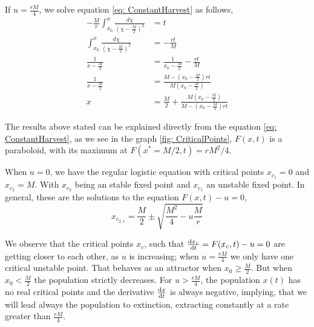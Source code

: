 If $u=\frac{rM}{4}$, we solve equation \ref{eq: ConstantHarvest} as follows,
\begin{align}
-\frac{M}{r}\int_{x_0}^{x}\frac{d\chi}{\left(\chi-\frac{M}{2}\right)^2}&=t\\
\int_{x_0}^{x}\frac{d\chi}{\left(\chi-\frac{M}{2}\right)^2}&=-\frac{rt}{M}\\
\frac{1}{x-\frac{M}{2}}&=\frac{1}{x_0-\frac{M}{2}}-\frac{rt}{M}\\
\frac{1}{x-\frac{M}{2}}&=\frac{M-\left(x_0-\frac{M}{2}\right)rt}{M\left(x_0-\frac{M}{2}\right)} \\
x&=\frac{M}{2}+\frac{M\left(x_0-\frac{M}{2}\right)}{M-\left(x_0-\frac{M}{2}\right)rt} 
\end{align}

The results above stated can be explained directly from the equation \ref{eq: ConstantHarvest}, as we see in the graph \ref{fig: CriticalPoints},  $F(x,t)$ is a paraboloid, with its maximum at $F(x^*=M/2,t)=rM^2/4$.

When $u=0$, we have the regular logistic equation with critical points $x_{c_1}=0$ and $x_{c_2}=M$. With $x_{c_2}$ being an stable fixed point and $x_{c_1}$ an unstable fixed point. In general, these are the solutions to the equation $F(x,t)-u=0$,
\begin{equation}
x_{c_{2,1}}=\frac{M}{2}\pm \sqrt{\frac{M^2}{4}-u\frac{M}{r}}
\end{equation}

We observe that the critical points $x_c$, such that $\frac{\mathrm{d} x_c}{{\mathrm{d} t}}=F(x_c, t)-u=0$ are getting closer to each other, as $u$ is increasing; when $u=\frac{rM}{4}$ we only have one critical unstable point. That behaves as an attractor when $x_0\geq\frac{M}{2}$. But when $x_0<\frac{M}{2}$ the population strictly decreases. For $u> \frac{rM}{4}$, the population $x(t)$ has no real critical points and the derivative $\frac{\mathrm{d} x}{{\mathrm{d} t}}$ is always negative, implying, that we will lead always the population to extinction, extracting constantly at a rate greater than $\frac{rM}{4}$.

